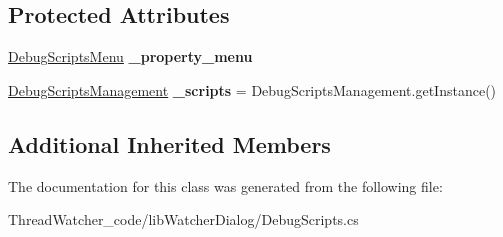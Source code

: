 \subsection*{Protected Attributes}
\begin{DoxyCompactItemize}
\item 
\hypertarget{classlib_watcher_dialog_1_1_debug_scripts_ref_a9751c7eb62310a6eed27115eee8e00b2}{\hyperlink{classlib_watcher_dialog_1_1_property_item_1_1_debug_script_1_1_debug_scripts_menu}{Debug\+Scripts\+Menu} {\bfseries \+\_\+property\+\_\+menu}}\label{classlib_watcher_dialog_1_1_debug_scripts_ref_a9751c7eb62310a6eed27115eee8e00b2}

\item 
\hypertarget{classlib_watcher_dialog_1_1_debug_scripts_ref_ae103e6ab1bb12446cc852d0a50342272}{\hyperlink{classlib_watcher_dialog_1_1_property_item_1_1_debug_script_1_1_debug_scripts_management}{Debug\+Scripts\+Management} {\bfseries \+\_\+scripts} = Debug\+Scripts\+Management.\+get\+Instance()}\label{classlib_watcher_dialog_1_1_debug_scripts_ref_ae103e6ab1bb12446cc852d0a50342272}

\end{DoxyCompactItemize}
\subsection*{Additional Inherited Members}


The documentation for this class was generated from the following file\+:\begin{DoxyCompactItemize}
\item 
Thread\+Watcher\+\_\+code/lib\+Watcher\+Dialog/Debug\+Scripts.\+cs\end{DoxyCompactItemize}
